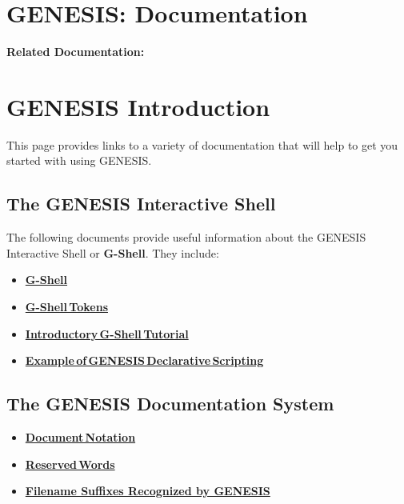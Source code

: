 \documentclass[12pt]{article}
\begin{document}
\section*{GENESIS: Documentation}

{\bf Related Documentation:}

\section*{GENESIS Introduction}

This page provides links to a variety of documentation that will help to get you started with using GENESIS.

\subsection*{The GENESIS Interactive Shell}

The following documents provide useful information about the GENESIS Interactive Shell or {\bf G-Shell}. They include:

\begin{itemize}
\item \href{../gshell/gshell.tex}{\bf G-Shell}
\item \href{../shell-tokens/shell-tokens.tex}{\bf G-Shell\,Tokens}
\item \href{../tutorial1/tutorial1.tex}{\bf Introductory\,G-Shell\,Tutorial}
\item \href{../example-script1/example-script1.tex}{\bf Example\,of\,GENESIS\,Declarative\,Scripting}
\end{itemize}

\subsection*{The GENESIS Documentation System}
\begin{itemize}
\item \href{../document-notation/document-notation.tex}{\bf Document\,Notation}
\item \href{../reserved-words/reserved-words.tex}{\bf Reserved\,Words}
\item \href{../common-suffixes/common-suffixes.tex}{\bf Filename Suffixes Recognized by GENESIS} 
\end{itemize}
\end{document}
